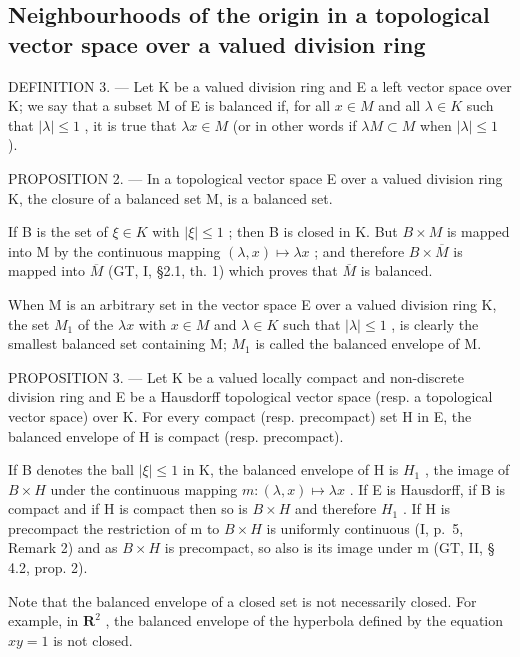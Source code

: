 \subsection{Neighbourhoods of the origin in a topological vector space over a valued division ring}

DEFINITION 3. --- Let K be a valued division ring and E a left vector space over K; we say that a subset M of E is balanced if, for all \(x \in M\) and all \(\lambda \in K\) such that \(|\lambda| \leqslant 1\) , it is true that \(\lambda x \in M\) (or in other words if \(\lambda M \subset M\) when \(|\lambda| \leqslant 1\) ).

PROPOSITION 2. --- In a topological vector space E over a valued division ring K, the closure of a balanced set M, is a balanced set.

If B is the set of \(\xi\in K\) with \(|\xi|\leqslant1\) ; then B is closed in K. But \(B\times M\) is mapped into M by the continuous mapping \((\lambda,x)\mapsto\lambda x\) ; and therefore \(B\times\overline{M}\) is mapped into \(\overline{M}\) (GT, I, §2.1, th. 1) which proves that \(\overline{M}\) is balanced.

When M is an arbitrary set in the vector space E over a valued division ring K, the set \(M_{1}\) of the \(\lambda x\) with \(x \in M\) and \(\lambda \in K\) such that \(|\lambda| \leqslant 1\) , is clearly the smallest balanced set containing M; \(M_{1}\) is called the balanced envelope of M.

PROPOSITION 3. --- Let K be a valued locally compact and non-discrete division ring and E be a Hausdorff topological vector space (resp. a topological vector space) over K. For every compact (resp. precompact) set H in E, the balanced envelope of H is compact (resp. precompact).

If B denotes the ball \(|\xi| \leqslant 1\) in K, the balanced envelope of H is \(H_{1}\) , the image of \(B \times H\) under the continuous mapping \(m: (\lambda, x) \mapsto \lambda x\) . If E is Hausdorff, if B is compact and if H is compact then so is \(B \times H\) and therefore \(H_{1}\) . If H is precompact the restriction of m to \(B \times H\) is uniformly continuous (I, p.~5, Remark 2) and as \(B \times H\) is precompact, so also is its image under m (GT, II, § 4.2, prop. 2).

Note that the balanced envelope of a closed set is not necessarily closed. For example, in \(\mathbf{R}^2\) , the balanced envelope of the hyperbola defined by the equation \(xy = 1\) is not closed.

